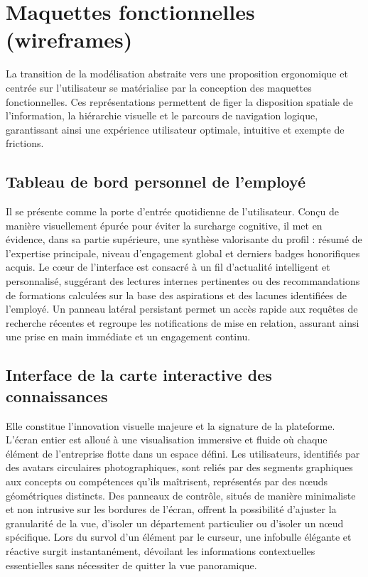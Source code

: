 \documentclass[12pt,a4paper]{article}
\begin{document}
\section{Maquettes fonctionnelles (wireframes)}

La transition de la modélisation abstraite vers une proposition ergonomique et centrée sur l'utilisateur se matérialise par la conception des maquettes fonctionnelles. Ces représentations permettent de figer la disposition spatiale de l'information, la hiérarchie visuelle et le parcours de navigation logique, garantissant ainsi une expérience utilisateur optimale, intuitive et exempte de frictions.

\subsection{Tableau de bord personnel de l'employé}
Il se présente comme la porte d'entrée quotidienne de l'utilisateur. Conçu de manière visuellement épurée pour éviter la surcharge cognitive, il met en évidence, dans sa partie supérieure, une synthèse valorisante du profil : résumé de l'expertise principale, niveau d'engagement global et derniers badges honorifiques acquis. Le cœur de l'interface est consacré à un fil d'actualité intelligent et personnalisé, suggérant des lectures internes pertinentes ou des recommandations de formations calculées sur la base des aspirations et des lacunes identifiées de l'employé. Un panneau latéral persistant permet un accès rapide aux requêtes de recherche récentes et regroupe les notifications de mise en relation, assurant ainsi une prise en main immédiate et un engagement continu.

\subsection{Interface de la carte interactive des connaissances}
Elle constitue l'innovation visuelle majeure et la signature de la plateforme. L'écran entier est alloué à une visualisation immersive et fluide où chaque élément de l'entreprise flotte dans un espace défini. Les utilisateurs, identifiés par des avatars circulaires photographiques, sont reliés par des segments graphiques aux concepts ou compétences qu'ils maîtrisent, représentés par des nœuds géométriques distincts. Des panneaux de contrôle, situés de manière minimaliste et non intrusive sur les bordures de l'écran, offrent la possibilité d'ajuster la granularité de la vue, d'isoler un département particulier ou d'isoler un nœud spécifique. Lors du survol d'un élément par le curseur, une infobulle élégante et réactive surgit instantanément, dévoilant les informations contextuelles essentielles sans nécessiter de quitter la vue panoramique.
\end{document}
